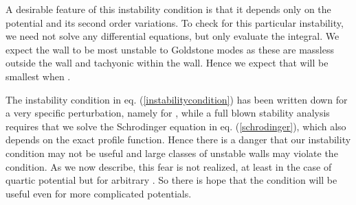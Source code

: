 \documentclass[a4paper,prd,nofootinbib,twocolumn,showpacs]{revtex4}
\begin{document}
A desirable feature of this instability condition is that it depends 
only on the potential \coordHE{} and its second order variations. To 
check for this particular instability, we need not solve any
differential equations, but only evaluate the integral.
We expect the wall to be most unstable to Goldstone modes as
these are massless outside the wall and tachyonic within the wall.
Hence we expect that \coordHE{} will be smallest when \coordHE{}. 

The instability condition in eq. (\ref{instabilitycondition})
has been written down for a very specific perturbation, namely
for \coordHE{}, while a full blown stability analysis requires
that we solve the Schrodinger equation in eq. (\ref{schrodinger}),
which also depends on the exact profile function. Hence there is 
a danger that our instability condition may not be useful and
large classes of unstable walls may violate the condition. As we
now describe, this fear is not realized, at least in the case of 
quartic potential but for arbitrary \coordHE{}. So there is hope that the
condition will be useful even for more complicated potentials.
\end{document}
